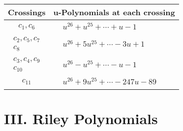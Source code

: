 \documentclass[1p]{elsarticle_modified}
\theoremstyle{definition}
\begin{document}
\begin{tabular}{m{50pt}|m{274pt}}
Crossings & \hspace{64pt}u-Polynomials at each crossing \\
\hline $$\begin{aligned}c_{1},c_{6}\end{aligned}$$&$\begin{aligned}
&u^{26}+u^{25}+\cdots+u-1
\end{aligned}$\\
\hline $$\begin{aligned}c_{2},c_{5},c_{7}\\c_{8}\end{aligned}$$&$\begin{aligned}
&u^{26}+5 u^{25}+\cdots-3 u+1
\end{aligned}$\\
\hline $$\begin{aligned}c_{3},c_{4},c_{9}\\c_{10}\end{aligned}$$&$\begin{aligned}
&u^{26}- u^{25}+\cdots- u-1
\end{aligned}$\\
\hline $$\begin{aligned}c_{11}\end{aligned}$$&$\begin{aligned}
&u^{26}+9 u^{25}+\cdots-247 u-89
\end{aligned}$\\
\hline
\end{tabular}\newpage\renewcommand{\arraystretch}{1}
\centering \section*{ III. Riley Polynomials}
\end{document}
